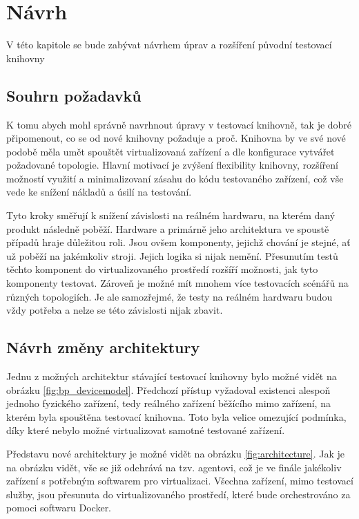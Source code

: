 \chapter{Návrh}\label{chap:design}

V této kapitole se bude zabývat návrhem úprav a rozšíření původní testovací knihovny


\section{Souhrn požadavků}

K tomu abych mohl správně navrhnout úpravy v testovací knihovně, tak je dobré připomenout, co se od nové knihovny požaduje a proč. Knihovna by ve své nové podobě měla umět spouštět virtualizovaná zařízení a dle konfigurace vytvářet požadované topologie. Hlavní motivací je zvýšení flexibility knihovny, rozšíření možností využití a minimalizovaní zásahu do kódu testovaného zařízení, což vše vede ke snížení nákladů a úsilí na testování.  

Tyto kroky směřují k snížení závislosti na reálném hardwaru, na kterém daný produkt následně poběží. Hardware a primárně jeho architektura ve spoustě případů hraje důležitou roli. Jsou ovšem komponenty, jejichž chování je stejné, ať už poběží na jakémkoliv stroji. Jejich logika si nijak nemění. Přesunutím testů těchto komponent do virtualizovaného prostředí rozšíří možnosti, jak tyto komponenty testovat. Zároveň je možné mít mnohem více testovacích scénářů na různých topologiích. Je ale samozřejmé, že testy na reálném hardwaru budou vždy potřeba a nelze se této závislosti nijak zbavit.


\section{Návrh změny architektury}

Jednu z možných architektur stávající testovací knihovny bylo možné vidět na obrázku \ref{fig:bp_devicemodel}. Předchozí přístup vyžadoval existenci alespoň jednoho fyzického zařízení, tedy reálného zařízení běžícího mimo zařízení, na kterém byla spouštěna testovací knihovna. Toto byla velice omezující podmínka, díky které nebylo možné virtualizovat samotné testované zařízení.

Představu nové architektury je možné vidět na obrázku \ref{fig:architecture}. Jak je na obrázku vidět, vše se již odehrává na tzv. agentovi, což je ve finále jakékoliv zařízení s potřebným softwarem pro virtualizaci. Všechna zařízení, mimo testovací služby, jsou přesunuta do virtualizovaného prostředí, které bude orchestrováno za pomoci softwaru Docker. 

